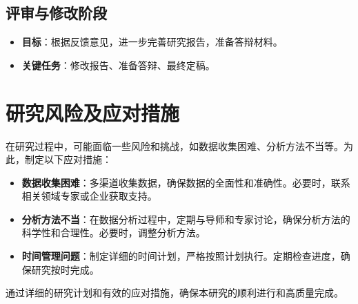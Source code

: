\subsection{评审与修改阶段}

\begin{itemize}
    \item \textbf{目标}：根据反馈意见，进一步完善研究报告，准备答辩材料。
    \item \textbf{关键任务}：修改报告、准备答辩、最终定稿。
\end{itemize}

\section{研究风险及应对措施}

在研究过程中，可能面临一些风险和挑战，如数据收集困难、分析方法不当等。为此，制定以下应对措施：

\begin{itemize}
    \item \textbf{数据收集困难}：多渠道收集数据，确保数据的全面性和准确性。必要时，联系相关领域专家或企业获取支持。
    \item \textbf{分析方法不当}：在数据分析过程中，定期与导师和专家讨论，确保分析方法的科学性和合理性。必要时，调整分析方法。
    \item \textbf{时间管理问题}：制定详细的时间计划，严格按照计划执行。定期检查进度，确保研究按时完成。
\end{itemize}

通过详细的研究计划和有效的应对措施，确保本研究的顺利进行和高质量完成。